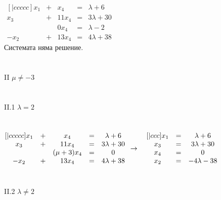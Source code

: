 \documentclass{article}
\begin{document}
    \begin{math}
        \begin{matrix}[|ccccc]
            x_1 & + & x_4 & = & \lambda + 6\\
            x_3 & + & 11x_4 & = & 3\lambda + 30\\
            ~ & ~ & 0x_4 & = & \lambda - 2\\
            -x_2 & + & 13x_4 & = & 4\lambda + 38
        \end{matrix}
    \end{math}\\
    Системата няма решение.\\
    \\
    \\
    II \(\mu \neq -3\)\\
    \\
    \\
    II.1 \(\lambda = 2\)\\
    \\
    \\
    \begin{math}
        \begin{matrix}[|ccccc]
            x_1 & + & x_4 & = & \lambda + 6\\
            x_3 & + & 11x_4 & = & 3\lambda + 30\\
            ~ & ~ & (\mu + 3)x_4 & = & 0\\
            -x_2 & + & 13x_4 & = & 4\lambda + 38
        \end{matrix}\\
        \\
        \\
        \to\quad
        \begin{matrix}[|ccc]
            x_1 & = & \lambda + 6\\
            x_3 & = & 3\lambda + 30\\
            x_4 & = & 0\\
            x_2 & = & -4\lambda - 38
        \end{matrix}
    \end{math}\\
    \\
    \\
    II.2 \(\lambda \neq 2\)\\
    \\
    \\
\end{document}

